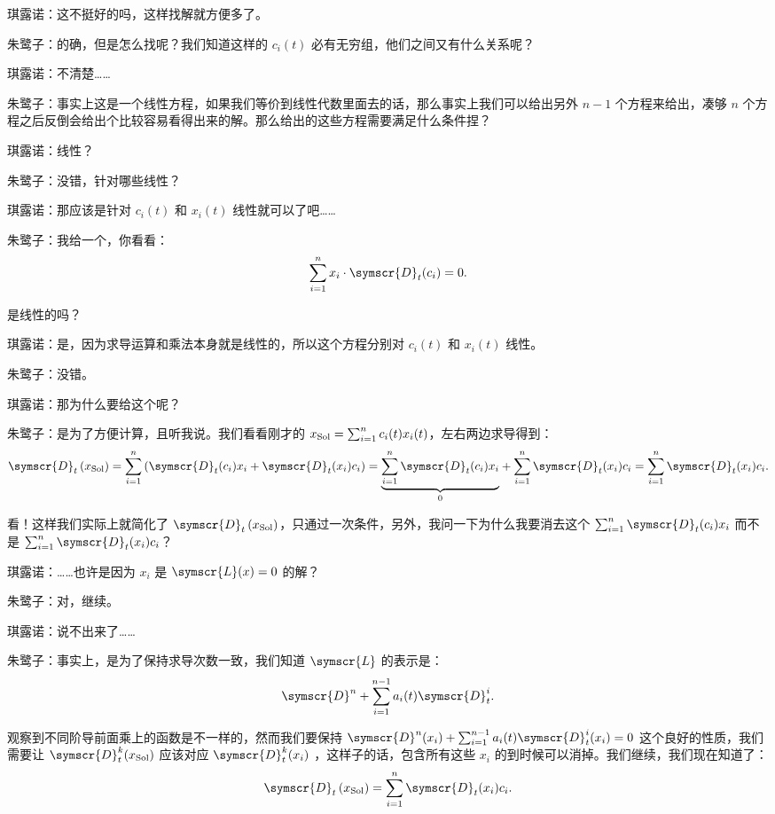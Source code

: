 琪露诺：这不挺好的吗，这样找解就方便多了。

朱鹭子：的确，但是怎么找呢？我们知道这样的 \(c_i(t)\) 必有无穷组，他们之间又有什么关系呢？

琪露诺：不清楚……

朱鹭子：事实上这是一个线性方程，如果我们等价到线性代数里面去的话，那么事实上我们可以给出另外 \(n-1\) 个方程来给出，凑够 \(n\) 个方程之后反倒会给出个比较容易看得出来的解。那么给出的这些方程需要满足什么条件捏？

琪露诺：线性？

朱鹭子：没错，针对哪些线性？

琪露诺：那应该是针对 \(c_i(t)\) 和 \(x_i(t)\) 线性就可以了吧……

朱鹭子：我给一个，你看看：
\[
	\sum_{i=1}^{n}x_i\cdot \symscr{D} _t(c_i)=0
	.\]

是线性的吗？

琪露诺：是，因为求导运算和乘法本身就是线性的，所以这个方程分别对 \(c_i(t)\) 和 \(x_i(t)\) 线性。

朱鹭子：没错。

琪露诺：那为什么要给这个呢？

朱鹭子：是为了方便计算，且听我说。我们看看刚才的 \(x_{\rm Sol}=\sum_{i=1}^{n} c_i(t)x_i(t)\)，左右两边求导得到：
\[
	\symscr{D} _t\left( x_{\rm Sol} \right) = \sum_{i=1}^{n}\left(  \symscr{D} _t(c_i)x_i+\symscr{D} _t(x_i)c_i\right)  =\underset{0}{\underbrace{ \sum_{i=1}^{n}\symscr{D} _t(c_i)x_i}}+\sum_{i=1}^{n}\symscr{D} _t(x_i)c_i=\sum_{i=1}^{n}\symscr{D} _t(x_i)c_i
	.\]

看！这样我们实际上就简化了 \(\symscr{D} _t\left( x_{\rm Sol} \right) \)，只通过一次条件，另外，我问一下为什么我要消去这个 \(\sum_{i=1}^{n}\symscr{D} _t(c_i)x_i\) 而不是 \(\sum_{i=1}^{n}\symscr{D} _t(x_i)c_i\)？

琪露诺：……也许是因为 \(x_i\) 是 \(\symscr{L} (x)=0\) 的解？

朱鹭子：对，继续。

琪露诺：说不出来了……

朱鹭子：事实上，是为了保持求导次数一致，我们知道 \(\symscr{L} \) 的表示是：
\[
	\symscr{D} ^n+\sum_{i=1}^{n-1} a_i(t)\symscr{D} _t^i
	.\]

观察到不同阶导前面乘上的函数是不一样的，然而我们要保持 \(\symscr{D} ^n(x_i)+\sum_{i=1}^{n-1} a_i(t)\symscr{D} _t^i (x_i) = 0\) 这个良好的性质，我们需要让 \(\symscr{D} _t^k(x_{\rm Sol})\) 应该对应 \(\symscr{D} _t^k(x_i)\) ，这样子的话，包含所有这些 \(x_i\) 的到时候可以消掉。我们继续，我们现在知道了：
\[
	\symscr{D} _t\left( x_{\rm Sol} \right) =\sum_{i=1}^{n}\symscr{D} _t(x_i)c_i
	.\]

